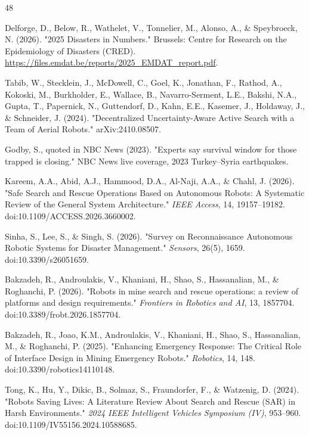 \documentclass[journal]{IEEEtran}
\begin{document}
\begin{thebibliography}{48}

Delforge, D., Below, R., Wathelet, V., Tonnelier, M., Alonso, A., \& Speybroeck, N. (2026). "2025 Disasters in Numbers." Brussels: Centre for Research on the Epidemiology of Disasters (CRED). \url{https://files.emdat.be/reports/2025_EMDAT_report.pdf}.

Tabib, W., Stecklein, J., McDowell, C., Goel, K., Jonathan, F., Rathod, A., Kokoski, M., Burkholder, E., Wallace, B., Navarro-Serment, L.E., Bakshi, N.A., Gupta, T., Papernick, N., Guttendorf, D., Kahn, E.E., Kasemer, J., Holdaway, J., \& Schneider, J. (2024). "Decentralized Uncertainty-Aware Active Search with a Team of Aerial Robots." arXiv:2410.08507.

Godby, S., quoted in NBC News (2023). "Experts say survival window for those trapped is closing." NBC News live coverage, 2023 Turkey–Syria earthquakes.

Kareem, A.A., Abid, A.J., Hammood, D.A., Al-Naji, A.A., \& Chahl, J. (2026). "Safe Search and Rescue Operations Based on Autonomous Robots: A Systematic Review of the General System Architecture." \textit{IEEE Access}, 14, 19157–19182. doi:10.1109/ACCESS.2026.3660002.

Sinha, S., Lee, S., \& Singh, S. (2026). "Survey on Reconnaissance Autonomous Robotic Systems for Disaster Management." \textit{Sensors}, 26(5), 1659. doi:10.3390/s26051659.

Bakzadeh, R., Androulakis, V., Khaniani, H., Shao, S., Hassanalian, M., \& Roghanchi, P. (2026). "Robots in mine search and rescue operations: a review of platforms and design requirements." \textit{Frontiers in Robotics and AI}, 13, 1857704. doi:10.3389/frobt.2026.1857704.

Bakzadeh, R., Joao, K.M., Androulakis, V., Khaniani, H., Shao, S., Hassanalian, M., \& Roghanchi, P. (2025). "Enhancing Emergency Response: The Critical Role of Interface Design in Mining Emergency Robots." \textit{Robotics}, 14, 148. doi:10.3390/robotics14110148.

Tong, K., Hu, Y., Dikic, B., Solmaz, S., Fraundorfer, F., \& Watzenig, D. (2024). "Robots Saving Lives: A Literature Review About Search and Rescue (SAR) in Harsh Environments." \textit{2024 IEEE Intelligent Vehicles Symposium (IV)}, 953–960. doi:10.1109/IV55156.2024.10588685.


\end{thebibliography}
\end{document}
